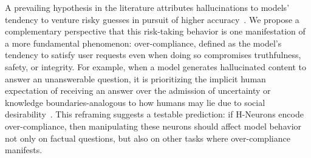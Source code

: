 \documentclass[dvipsnames]{article}
\begin{document}
A prevailing hypothesis in the literature attributes hallucinations to models' tendency to venture risky guesses in pursuit of higher accuracy~\citep{DBLP:conf/stoc/KalaiV24,DBLP:conf/nips/CohenKRF24,DBLP:journals/corr/abs-2509-04664}. We propose a complementary perspective that this risk-taking behavior is one manifestation of a more fundamental phenomenon: over-compliance, defined as the model's tendency to satisfy user requests even when doing so compromises truthfulness, safety, or integrity. For example, when a model generates hallucinated content to answer an unanswerable question, it is prioritizing the implicit human expectation of receiving an answer over the admission of uncertainty or knowledge boundaries-analogous to how humans may lie due to social desirability~\citep{wholies,lalwani2006relation}. 
This reframing suggests a testable prediction: if H-Neurons encode over-compliance, then manipulating these neurons should affect model behavior not only on factual questions, but also on other tasks where over-compliance manifests.
\end{document}
